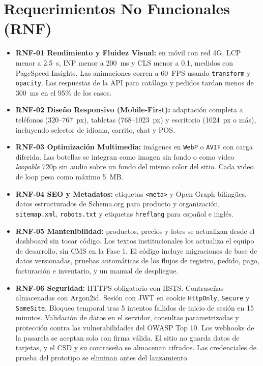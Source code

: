 \documentclass[11pt,letterpaper]{article}
\begin{document}
\section{Requerimientos No Funcionales (RNF)}
\begin{itemize}[leftmargin=1.5em]
    \item \textbf{RNF-01 Rendimiento y Fluidez Visual:} en móvil con red 4G, LCP menor a 2.5~s, INP menor a 200~ms y CLS menor a 0.1, medidos con PageSpeed Insights. Las animaciones corren a 60~FPS usando \texttt{transform} y \texttt{opacity}. Las respuestas de la API para catálogo y pedidos tardan menos de 300~ms en el 95\% de los casos.
    \item \textbf{RNF-02 Diseño Responsivo (Mobile-First):} adaptación completa a teléfonos (320--767~px), tabletas (768--1023~px) y escritorio (1024~px o más), incluyendo selector de idioma, carrito, chat y POS.
    \item \textbf{RNF-03 Optimización Multimedia:} imágenes en \texttt{WebP} o \texttt{AVIF} con carga diferida. Las botellas se integran como imagen sin fondo o como video \textit{loopable} 720p sin audio sobre un fondo del mismo color del sitio. Cada video de loop pesa como máximo 5~MB.
    \item \textbf{RNF-04 SEO y Metadatos:} etiquetas \texttt{<meta>} y Open Graph bilingües, datos estructurados de Schema.org para producto y organización, \texttt{sitemap.xml}, \texttt{robots.txt} y etiquetas \texttt{hreflang} para español e inglés.
    \item \textbf{RNF-05 Mantenibilidad:} productos, precios y lotes se actualizan desde el dashboard sin tocar código. Los textos institucionales los actualiza el equipo de desarrollo, sin CMS en la Fase 1. El código incluye migraciones de base de datos versionadas, pruebas automáticas de los flujos de registro, pedido, pago, facturación e inventario, y un manual de despliegue.
    \item \textbf{RNF-06 Seguridad:} HTTPS obligatorio con HSTS. Contraseñas almacenadas con Argon2id. Sesión con JWT en cookie \texttt{HttpOnly}, \texttt{Secure} y \texttt{SameSite}. Bloqueo temporal tras 5 intentos fallidos de inicio de sesión en 15 minutos. Validación de datos en el servidor, consultas parametrizadas y protección contra las vulnerabilidades del OWASP Top 10. Los webhooks de la pasarela se aceptan solo con firma válida. El sitio no guarda datos de tarjetas, y el CSD y su contraseña se almacenan cifrados. Las credenciales de prueba del prototipo se eliminan antes del lanzamiento.

\end{itemize}
\end{document}
